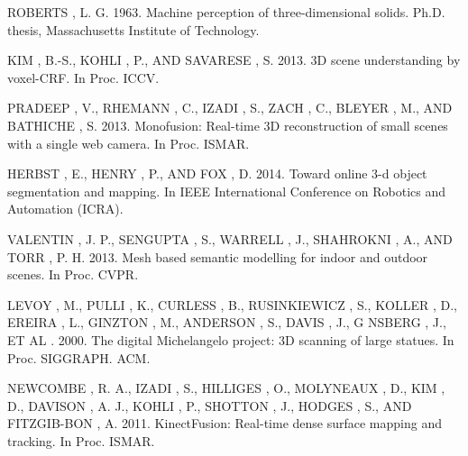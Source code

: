 \documentclass{llncs}
\begin{document}

\begin{thebibliography}{1}

  ROBERTS , L. G. 1963. Machine perception of three-dimensional solids. Ph.D. thesis, Massachusetts Institute of Technology.

  KIM , B.-S., KOHLI , P., AND SAVARESE , S. 2013. 3D scene understanding by voxel-CRF. In Proc. ICCV.

  PRADEEP , V., RHEMANN , C., IZADI , S., ZACH , C., BLEYER , M., AND BATHICHE , S. 2013. Monofusion: Real-time 3D reconstruction of small scenes with a single web camera. In Proc. ISMAR.

  HERBST , E., HENRY , P., AND FOX , D. 2014. Toward online 3-d object segmentation and mapping. In IEEE International Conference on Robotics and Automation (ICRA).

  VALENTIN , J. P., SENGUPTA , S., WARRELL , J., SHAHROKNI , A., AND TORR , P. H. 2013. Mesh based semantic modelling for indoor and outdoor scenes. In Proc. CVPR.

  LEVOY , M., PULLI , K., CURLESS , B., RUSINKIEWICZ , S., KOLLER , D., EREIRA , L., GINZTON , M., ANDERSON , S., DAVIS , J., G NSBERG , J., ET AL . 2000. The digital Michelangelo project: 3D scanning of large statues. In Proc. SIGGRAPH. ACM.

  NEWCOMBE , R. A., IZADI , S., HILLIGES , O., MOLYNEAUX , D., KIM , D., DAVISON , A. J., KOHLI , P., SHOTTON , J., HODGES , S., AND FITZGIB-BON , A. 2011. KinectFusion: Real-time dense surface mapping and tracking. In Proc. ISMAR.
	
\end{thebibliography}

\end{document}
